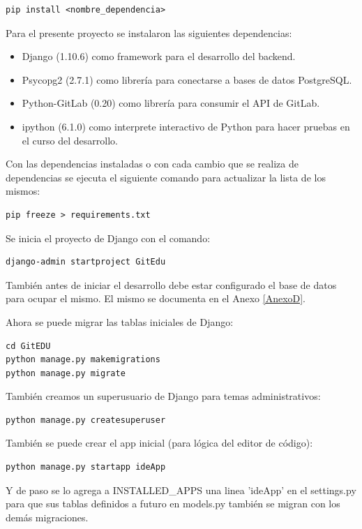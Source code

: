 \begin{lstlisting}
pip install <nombre_dependencia>
\end{lstlisting}

Para el presente proyecto se instalaron las siguientes dependencias:
\begin{itemize}
	\item Django (1.10.6) como framework para el desarrollo del backend.
    \item Psycopg2 (2.7.1) como librería para conectarse a bases de datos PostgreSQL.
    \item Python-GitLab (0.20) como librería para consumir el API de GitLab.
    \item ipython (6.1.0) como interprete interactivo de Python para hacer pruebas en el curso del desarrollo.
\end{itemize}

Con las dependencias instaladas o con cada cambio que se realiza de dependencias se ejecuta el siguiente comando para actualizar la lista de los mismos:

\begin{lstlisting}
pip freeze > requirements.txt
\end{lstlisting}

Se inicia el proyecto de Django con el comando:

\begin{lstlisting}
django-admin startproject GitEdu
\end{lstlisting}

También antes de iniciar el desarrollo debe estar configurado el base de datos para ocupar el mismo.  El mismo se documenta en el Anexo \ref{AnexoD}.

Ahora se puede migrar las tablas iniciales de Django:
\begin{lstlisting}
cd GitEDU
python manage.py makemigrations
python manage.py migrate
\end{lstlisting}

También creamos un superusuario de Django para temas administrativos:
\begin{lstlisting}
python manage.py createsuperuser
\end{lstlisting}

También se puede crear el app inicial (para lógica del editor de código):
\begin{lstlisting}
python manage.py startapp ideApp
\end{lstlisting}

Y de paso se lo agrega a INSTALLED\_APPS una linea 'ideApp' en el settings.py para que sus tablas definidos a futuro en models.py también se migran con los demás migraciones.

